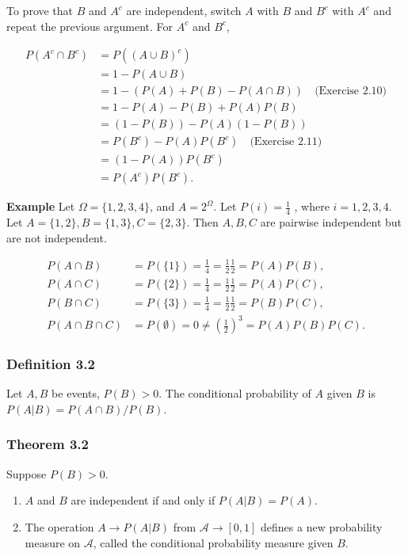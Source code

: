 \documentclass{article}
\begin{document}
To prove that $B$ and $A^c$ are independent, switch $A$ with $B$ and $B^c$ with $A^c$ and repeat the previous argument. For $A^c$ and $B^c$,

\begin{align*}
P(A^c \cap B^c) &= P((A \cup B)^c)  \\
&= 1 - P(A\cup B) \\
&= 1 - (P(A) + P(B) - P(A\cap B)) \quad \text{(Exercise 2.10)} \\
&= 1 - P(A) - P(B) + P(A)P(B) \\
&= (1-P(B))-P(A)(1-P(B))  \\
&= P(B^c) - P(A)P(B^c) \quad \text{(Exercise 2.11)} \\
&= (1 - P(A))P(B^c) \\
&= P(A^c)P(B^c).
\end{align*}

{\bf Example} Let $\Omega = \{1, 2, 3, 4\}$, and $A = 2^\Omega$. Let $P(i) = \frac{1}{4}$ , where $i = 1, 2, 3, 4$. Let $A = \{1, 2\}, B = \{1, 3\}, C = \{2, 3\}$. Then $A, B, C$ are pairwise independent but are not independent.

\begin{align*}
P(A\cap B) &= P(\{1\}) = \frac{1}{4} = \frac{1}{2}\frac{1}{2} = P(A)P(B), \\
P(A \cap C) &= P(\{2\}) = \frac{1}{4} = \frac{1}{2}\frac{1}{2} = P(A)P(C), \\
P(B\cap C) &= P(\{3\}) = \frac{1}{4} = \frac{1}{2}\frac{1}{2} = P(B)P(C), \\
P(A\cap B \cap C) &= P(\emptyset) = 0 \neq \left(\frac{1}{2}\right)^3 = P(A)P(B)P(C).
\end{align*}

\subsubsection*{Definition 3.2} Let $A,B$ be events, $P(B) > 0$. The conditional probability of $A$ given $B$ is $P(A \vert B) = P(A\cap B) / P(B)$. \\

\subsubsection*{Theorem 3.2} Suppose $P(B) > 0$. 

\begin{enumerate}
\item $A$ and $B$ are independent if and only if $P(A \vert B) = P(A)$.

\item The operation $A \rightarrow P(A | B)$ from $\mathcal{A} \rightarrow [0, 1]$ defines a new probability
measure on $\mathcal{A}$, called the conditional probability measure given $B$.
\end{enumerate}
\end{document}
